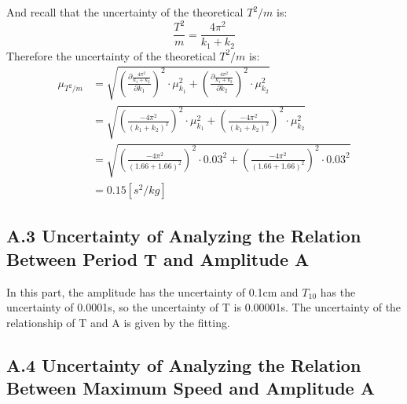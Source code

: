 \documentclass[11pt,a4paper]{article}
\begin{document}
\qquad And recall that the uncertainty of the theoretical $T^2/m$ is:
\begin{equation*}
    \frac{T^2}{m}=\frac{4\pi^2}{k_1+k_2}
\end{equation*}
\newpage
Therefore the uncertainty of the theoretical $T^2/m$ is:
\begin{equation*}
    \begin{split}
        \mu_{T^2/m}&=\sqrt{\left(\frac{\partial \frac{4\pi^2}{k_1+k_2}}{\partial k_1}\right)^2\cdot \mu_{k_1}^2+\left(\frac{\partial \frac{4\pi^2}{k_1+k_2}}{\partial k_2}\right)^2\cdot \mu_{k_2}^2}\\
        &=\sqrt{\left(\frac{-4\pi^2}{(k_1+k_2)^2}\right)^2\cdot \mu_{k_1}^2+\left(\frac{-4\pi^2}{(k_1+k_2)^2}\right)^2\cdot \mu_{k_2}^2}\\
        &=\sqrt{\left(\frac{-4\pi^2}{(1.66+1.66)^2}\right)^2\cdot 0.03^2+\left(\frac{-4\pi^2}{(1.66+1.66)^2}\right)^2\cdot 0.03^2}\\
        &=0.15[s^2/kg]
    \end{split}
\end{equation*}
\subsection*{A.3 Uncertainty of Analyzing the Relation Between Period T and Amplitude A}
\qquad In this part, the amplitude has the uncertainty of 0.1cm and $T_{10}$ has the uncertainty of 0.0001s, so the uncertainty of T is 0.00001s. The uncertainty of the relationship of T and A is given by the fitting.
\subsection*{A.4 Uncertainty of Analyzing the Relation Between Maximum Speed and Amplitude A}
\end{document}
